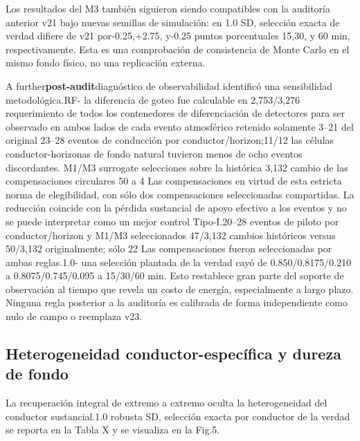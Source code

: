 \documentclass{ieeeaccess}
\begin{document}
Los resultados del M3 también siguieron siendo compatibles con la auditoría anterior v21 bajo nuevas semillas de simulación: en 1.0 SD, selección exacta de verdad difiere de v21 por-0.25,+2.75, y-0.25 puntos porcentuales 15,30, y 60 min, respectivamente. Esta es una comprobación de consistencia de Monte Carlo en el mismo fondo físico, no una replicación externa.

A further\textbf{post-audit}diagnóstico de observabilidad identificó una sensibilidad metodológica.RF- la diferencia de goteo fue calculable en 2,753/3,276 requerimiento de todos los contenedores de diferenciación de detectores para ser observado en ambos lados de cada evento atmosférico retenido solamente 3--21 del original 23--28 eventos de conducción por conductor/horizon;11/12 las células conductor-horizonas de fondo natural tuvieron menos de ocho eventos discordantes. M1/M3 surrogate selecciones sobre la histórica 3,132 cambio de las compensaciones circulares 50 a 4 Las compensaciones en virtud de esta estricta norma de elegibilidad, con sólo dos compensaciones seleccionadas compartidas. La reducción coincide con la pérdida sustancial de apoyo efectivo a los eventos y no se puede interpretar como un mejor control Tipo-I.20--28 eventos de piloto por conductor/horizon y M1/M3 seleccionados 47/3,132 cambios históricos versus 50/3,132 originalmente; sólo 22 Las compensaciones fueron seleccionadas por ambas reglas.1.0- una selección plantada de la verdad cayó de 0.850/0.8175/0.210 a 0.8075/0.745/0.095 a 15/30/60 min. Esto restablece gran parte del soporte de observación al tiempo que revela un costo de energía, especialmente a largo plazo. Ninguna regla posterior a la auditoría es calibrada de forma independiente como nulo de campo o reemplaza v23.

\subsection{Heterogeneidad conductor-específica y dureza de fondo}\label{heterogeneidad-conductor-especuxedfica-y-dureza-de-fondo}

La recuperación integral de extremo a extremo oculta la heterogeneidad del conductor sustancial.1.0 robusta SD, selección exacta por conductor de la verdad se reporta en la Tabla X y se visualiza en la Fig.5.
\end{document}

